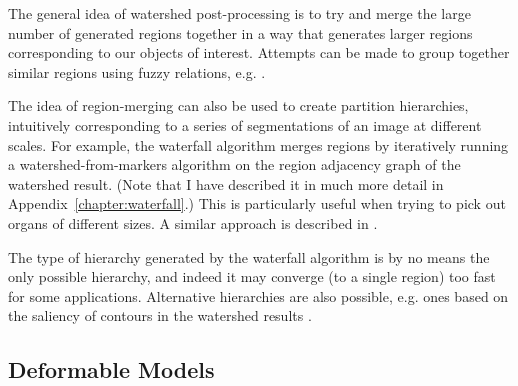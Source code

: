 The general idea of watershed post-processing is to try and merge the large number of generated regions together in a way that generates larger regions corresponding to our objects of interest. Attempts can be made to group together similar regions using fuzzy relations, e.g. \cite{patino05}.

The idea of region-merging can also be used to create partition hierarchies, intuitively corresponding to a series of segmentations of an image at different scales. For example, the waterfall algorithm \cite{beucher01,marcotegui05} merges regions by iteratively running a watershed-from-markers algorithm on the region adjacency graph of the watershed result. (Note that I have described it in much more detail in Appendix~\ref{chapter:waterfall}.) This is particularly useful when trying to pick out organs of different sizes. A similar approach is described in \cite{wegner95}.

The type of hierarchy generated by the waterfall algorithm is by no means the only possible hierarchy, and indeed it may converge (to a single region) too fast for some applications. Alternative hierarchies are also possible, e.g. ones based on the saliency of contours in the watershed results \cite{najman96}.\footnotemark{}




\subsection{Deformable Models}


